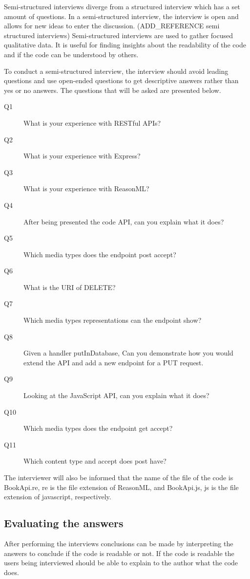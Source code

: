 Semi-structured interviews diverge from a structured interview which has a set
amount of questions. In a semi-structured interview, the interview is open and
allows for new ideas to enter the discussion. (ADD\_REFERENCE semi structured
interviews) Semi-structured interviews are used to gather focused qualitative
data. It is useful for finding insights about the readability of the code and if
the code can be understood by others.

To conduct a semi-structured interview, the interview should avoid leading
questions and use open-ended questions to get descriptive answers rather than
yes or no answers. The questions that will be asked are presented below.

\begin{description}
    \item[Q1] What is your experience with RESTful APIs?
    \item[Q2] What is your experience with Express?
    \item[Q3] What is your experience with ReasonML?
    \item[Q4] After being presented the code API, can you explain what it does?
    \item[Q5] Which media types does the endpoint post accept?
    \item[Q6] What is the URI of DELETE?
    \item[Q7] Which media types representations can the endpoint show?
    \item[Q8] Given a handler putInDatabase, Can you demonstrate how you would
        extend the API and add a new endpoint for a PUT request.
    \item[Q9] Looking at the JavaScript API, can you explain what it does?
    \item[Q10] Which media types does the endpoint get accept?
    \item[Q11] Which content type and accept does post have?
\end{description}

The interviewer will also be informed that the name of the file of the code is
BookApi.re, re is the file extension of ReasonML, and BookApi.js, js is the file
extension of javascript, respectively. 

\subsection{Evaluating the answers}

After performing the interviews conclusions can be made by interpreting the
answers to conclude if the code is readable or not. If the code is readable the
users being interviewed should be able to explain to the author what the code
does.

